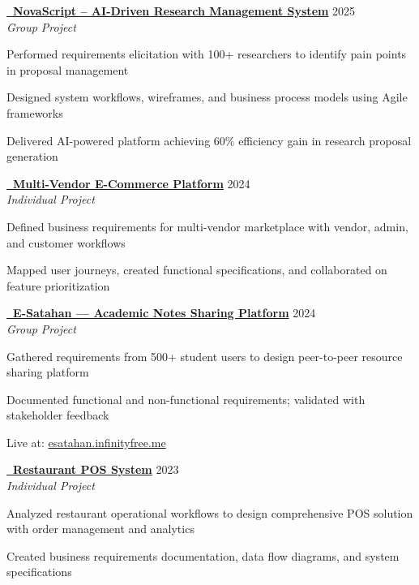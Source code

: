 \documentclass[letterpaper,10pt]{article}
\newenvironment{resume_list}{
  \vspace{-1pt}
  \begin{itemize}[itemsep=2pt, leftmargin=14pt]
}{
  \end{itemize}\vspace{-2pt}
}
\begin{document}
\vspace{3pt}
\href{https://github.com/Chandima0406/NovaScript.git}{\textbf{\faGithub~NovaScript – AI-Driven Research Management System}} \hfill 2025\\
\textit{Group Project}
\begin{resume_list}
  \item Performed requirements elicitation with 100+ researchers to identify pain points in proposal management
  \item Designed system workflows, wireframes, and business process models using Agile frameworks
  \item Delivered AI-powered platform achieving 60\% efficiency gain in research proposal generation
\end{resume_list}

\vspace{3pt}
\href{https://github.com/vindyakodithuwakku02/gocart.git}{\textbf{\faGithub~Multi-Vendor E-Commerce Platform}} \hfill 2024\\
\textit{Individual Project}
\begin{resume_list}
  \item Defined business requirements for multi-vendor marketplace with vendor, admin, and customer workflows
  \item Mapped user journeys, created functional specifications, and collaborated on feature prioritization
\end{resume_list}

\vspace{3pt}
\href{https://github.com/Chandima0406/E-Satahan.git}{\textbf{\faGithub~E-Satahan — Academic Notes Sharing Platform}} \hfill 2024\\
\textit{Group Project}
\begin{resume_list}
  \item Gathered requirements from 500+ student users to design peer-to-peer resource sharing platform
  \item Documented functional and non-functional requirements; validated with stakeholder feedback
  \item Live at: \href{https://esatahan.infinityfree.me}{esatahan.infinityfree.me}
\end{resume_list}

\vspace{3pt}
\href{https://github.com/vindyakodithuwakku02/pos-system.git}{\textbf{\faGithub~Restaurant POS System}} \hfill 2023\\
\textit{Individual Project}
\begin{resume_list}
  \item Analyzed restaurant operational workflows to design comprehensive POS solution with order management and analytics
  \item Created business requirements documentation, data flow diagrams, and system specifications
\end{resume_list}
\end{document}
